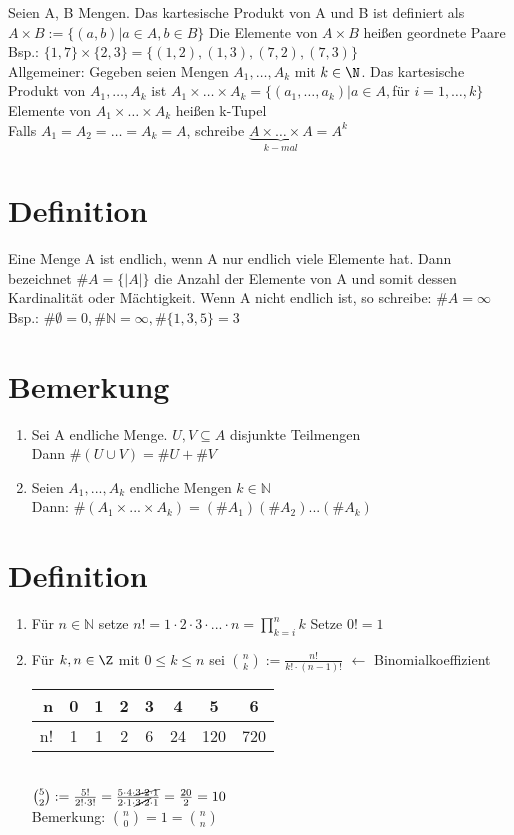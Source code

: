 \Def
Seien A, B Mengen. Das kartesische Produkt von A und B ist definiert als $A × B := \{(a,b)|a\in A, b \in B\}$ Die Elemente von $A × B$ heißen geordnete Paare\\
Bsp.: $\{1,7\}\times \{2,3\}=\{(1,2),(1,3),(7,2),(7,3)\}$\\
Allgemeiner: Gegeben seien Mengen
$A_1,…,A_k$ mit $k \in \N$. Das kartesische Produkt von $A_1,…,A_k$ ist $A_1\times …\times A_k = \{(a_1,…,a_k)|a\in A, $für $i=1,…,k\}$\\
Elemente von $A_1 × … × A_k$ heißen k-Tupel\\
Falls $A_1=A_2=…=A_k=A$, schreibe $\underbrace{A\times…\times A}_{k-mal}=A^k$

\section{Definition}
Eine Menge A ist endlich, wenn A nur endlich viele Elemente hat. Dann bezeichnet
$\#A = \{|A|\}$ die Anzahl der Elemente von A und somit dessen Kardinalit\"at
oder M\"achtigkeit. Wenn A nicht endlich ist, so schreibe: $\# A= \infty$\\
Bsp.: $\#\emptyset = 0, \#\mathds{N}=\infty, \# \{1,3,5\} = 3$

\section{Bemerkung}
\begin{enumerate}
\item Sei A endliche Menge. $U,V\subseteq A$ disjunkte Teilmengen\\
Dann $\#(U\cup V)=\# U + \# V$ 
\item Seien $A_1,...,A_k$ endliche Mengen $k \in \mathds{N}$\\
Dann: $\#(A_1 \times ... \times A_k)=(\#A_1)(\#A_2)...(\#A_k)$
\end{enumerate}

\section{Definition}
\begin{enumerate}
\item Für $n\in \mathds{N}$ setze $n!=1\cdot 2\cdot 3\cdot ... \cdot n=\prod_{k=i}^n k$
Setze $0!=1$
\item Für $k,n\in \Z$ mit $0\le k \le n$ sei ${n \choose k} := \frac{n!}{k!\cdot(n-1)!}$ $\leftarrow$ Binomialkoeffizient\\
\begin{tabular}{r|c|c|c|c|c|c|c}
n & 0 & 1 & 2 & 3 & 4 & 5 & 6\\ \hline
n! & 1 & 1 & 2 & 6 & 24 & 120 & 720
\end{tabular}\\
\bsp
${5 \choose 2} := \frac{5!}{2!\cdot 3!} = \frac{5\cdot 4 \cdot\cancel{3 \cdot 2 \cdot 1}}{2\cdot 1\cdot \cancel{3\cdot 2}\cdot 1 } = \frac{20}{2}=10$\\
Bemerkung: ${ n \choose 0 }= 1 = {n \choose n}$
\end{enumerate}
